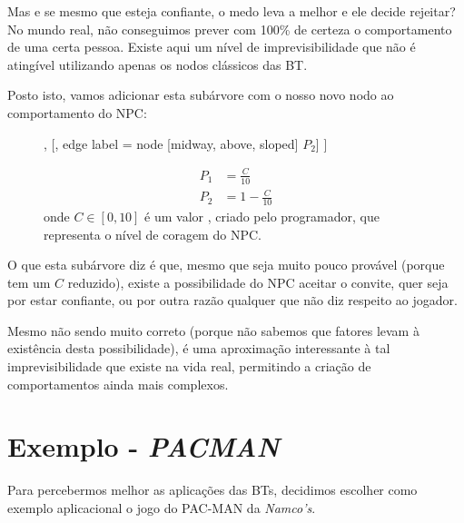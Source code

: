 {    Mas e se mesmo que esteja confiante, o medo leva a melhor e ele decide rejeitar?
    No mundo real, não conseguimos prever com 100\% de certeza o comportamento de uma certa pessoa.
    Existe aqui um nível de imprevisibilidade que não é atingível utilizando apenas os nodos clássicos das BT.

    Posto isto, vamos adicionar esta subárvore com o nosso novo nodo ao comportamento do NPC:

    \begin{figure}[H]
    \centering
        \begin{behavior}
            [\probselector
                [\action{Accept}, edge label = {node [midway, above, sloped] {$P_1$}}],
                [, edge label = {node [midway, above, sloped] {$P_2$}}]
            ]
        \end{behavior}

        \begin{align*}
            P_1 &= \frac{C}{10} \\
            P_2 &= 1 - \frac{C}{10}
        \end{align*}
        onde $C \in [0,10]$ é um valor , criado pelo programador, que representa o nível de coragem do NPC.
    \end{figure}
    
    O que esta subárvore diz é que, mesmo que seja muito pouco provável (porque tem um $C$ reduzido), existe a possibilidade do NPC aceitar o convite, quer seja por estar confiante, ou por outra razão qualquer que não diz respeito ao jogador.

    Mesmo não sendo muito correto (porque não sabemos que fatores levam à existência desta possibilidade), é uma aproximação interessante à tal imprevisibilidade que existe na vida real, permitindo a criação de comportamentos ainda mais complexos.

}








\section{Exemplo - \textit{PACMAN}}

Para percebermos melhor as aplicações das BTs, decidimos escolher como exemplo aplicacional o jogo do PAC-MAN da \textit{Namco’s}. 

